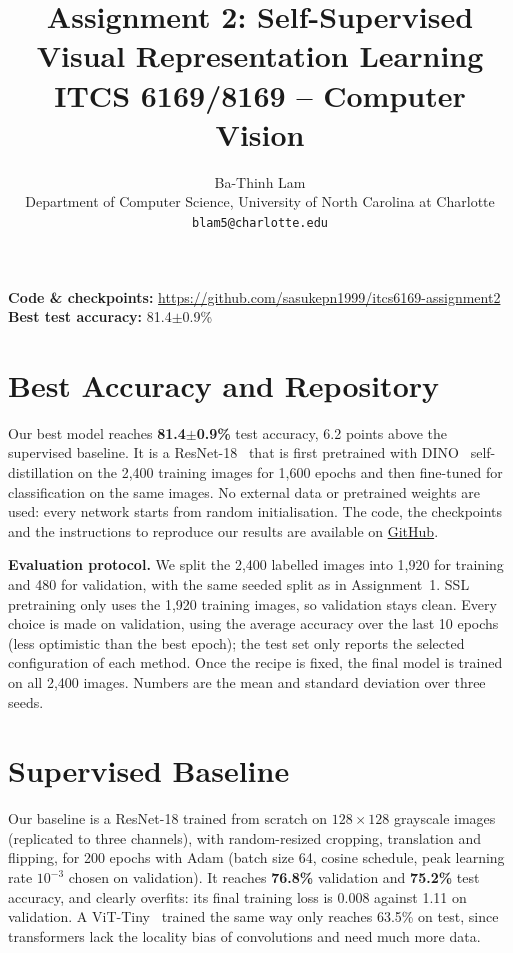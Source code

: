 \documentclass{article}
\title{Assignment 2: Self-Supervised Visual Representation Learning\\[2pt] \large ITCS 6169/8169 -- Computer Vision}
\author{%
  Ba-Thinh Lam \\ Department of Computer Science, University of North Carolina at Charlotte \\ \texttt{blam5@charlotte.edu}
}
\begin{document}
\maketitle
\vspace{-0.9cm}
\begin{center}
\textbf{Code \& checkpoints:} \url{https://github.com/sasukepn1999/itcs6169-assignment2} \quad
\textbf{Best test accuracy:} 81.4$\pm$0.9\%
\end{center}

\section{Best Accuracy and Repository}
\label{sec:result}

Our best model reaches \textbf{81.4$\pm$0.9\%} test accuracy, 6.2 points above the supervised baseline. It is a ResNet-18~\cite{resnet} that is first pretrained with DINO~\cite{dino} self-distillation on the 2,400 training images for 1,600 epochs and then fine-tuned for classification on the same images. No external data or pretrained weights are used: every network starts from random initialisation. The code, the checkpoints and the instructions to reproduce our results are available on \href{https://github.com/sasukepn1999/itcs6169-assignment2}{GitHub}.

\textbf{Evaluation protocol.} We split the 2,400 labelled images into 1,920 for training and 480 for validation, with the same seeded split as in Assignment~1. SSL pretraining only uses the 1,920 training images, so validation stays clean. Every choice is made on validation, using the average accuracy over the last 10 epochs (less optimistic than the best epoch); the test set only reports the selected configuration of each method. Once the recipe is fixed, the final model is trained on all 2,400 images. Numbers are the mean and standard deviation over three seeds.

\section{Supervised Baseline}
\label{sec:baseline}

Our baseline is a ResNet-18 trained from scratch on $128\times128$ grayscale images (replicated to three channels), with random-resized cropping, translation and flipping, for 200 epochs with Adam (batch size 64, cosine schedule, peak learning rate $10^{-3}$ chosen on validation). It reaches \textbf{76.8\%} validation and \textbf{75.2\%} test accuracy, and clearly overfits: its final training loss is 0.008 against 1.11 on validation. A ViT-Tiny~\cite{vit} trained the same way only reaches 63.5\% on test, since transformers lack the locality bias of convolutions and need much more data.
\end{document}
